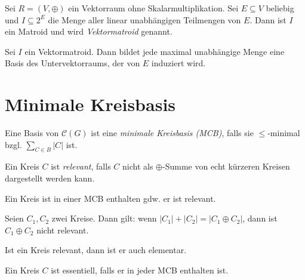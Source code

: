 \begin{definition}
    Sei $ R = (V, \oplus) $ ein Vektorraum ohne Skalarmultiplikation.
    Sei $ E \subseteq V $ beliebig und $ I \subseteq 2^E $ die Menge aller linear unabhängigen Teilmengen von $ E $.
    Dann ist $ I $ ein Matroid und wird \textit{Vektormatroid} genannt.
\end{definition}

\begin{proposition}
    Sei $ I $ ein Vektormatroid.
    Dann bildet jede maximal unabhängige Menge eine Basis des Untervektorraums, der von $ E $ induziert wird.
\end{proposition}

\section{Minimale Kreisbasis}

\begin{definition}
    Eine Basis von $ \mathcal{C}(G) $ ist eine \textit{minimale Kreisbasis (MCB)}, falls sie $ \leq $-minimal bzgl. $ \sum_{C \in B} |C| $ ist.
\end{definition}

\begin{definition}[Relevant]
    Ein Kreis $ C $ ist \textit{relevant}, falls $ C $ nicht als $ \oplus $-Summe von echt kürzeren Kreisen dargestellt werden kann.

\end{definition}

\begin{proposition}
    Ein Kreis ist in einer MCB enthalten gdw. er ist relevant.
\end{proposition}

\begin{proposition}
    Seien $ C_1, C_2 $ zwei Kreise.
    Dann gilt: wenn $ |C_1| + |C_2| = |C_1 \oplus C_2| $, dann ist $ C_1 \oplus C_2 $ nicht relevant.
\end{proposition}

\begin{proposition}
    Ist ein Kreis relevant, dann ist er auch elementar.
\end{proposition}

\begin{definition}[Essentiell]
    Ein Kreis $ C $ ist essentiell, falls er in jeder MCB enthalten ist.
\end{definition}

